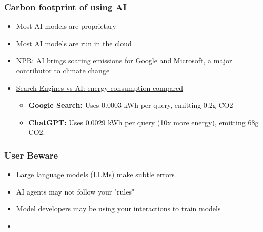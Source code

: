 \documentclass[aspectratio=169,hyperref=colorlinks]{beamer}
\begin{document}
\begin{frame}[t]
  \frametitle{Carbon footprint of using AI}

\begin{itemize}
  \begin{itemize}
  \item Most AI models are proprietary
  \item Most AI models are run in the cloud
  \end{itemize}
  \begin{itemize}
  \item \href{https://www.npr.org/2024/07/12/g-s1-9545/ai-brings-soaring-emissions-for-google-and-microsoft-a-major-contributor-to-climate-change}{NPR: AI brings soaring emissions for Google and Microsoft, a major contributor to climate change}
  \item \href{https://kanoppi.co/search-engines-vs-ai-energy-consumption-compared/}{Search Engines vs AI: energy consumption compared}
    \begin{itemize}
    \item {\bfseries Google Search:} Uses 0.0003 kWh per query, emitting 0.2g CO2
    \item {\bfseries ChatGPT:} Uses 0.0029 kWh per query (10x more energy), emitting 68g CO2.
    \end{itemize}
  \end{itemize}
\end{itemize}

\end{frame}  


\begin{frame}
  \frametitle{User Beware}
  \summary{}

  \begin{itemize}
  \item Large language models (LLMs) make subtle errors
  \item AI agents may not follow your "rules"
  \item Model developers may be using your interactions to train models
  \item {}
  \end{itemize}

\end{frame}  


\end{document}
